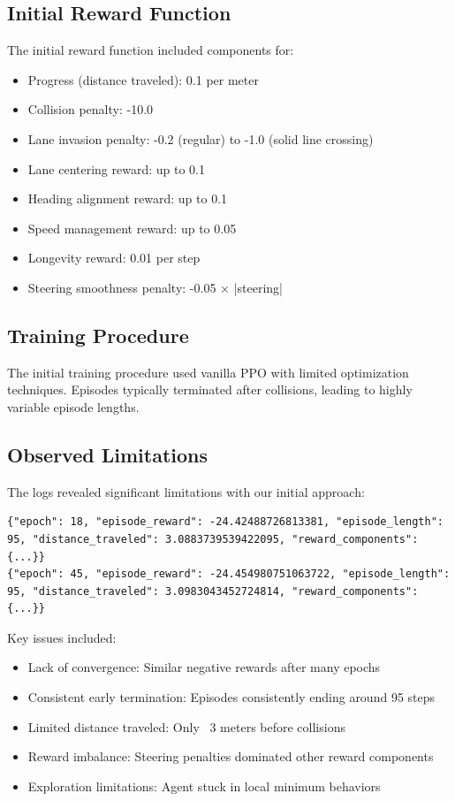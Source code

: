 \documentclass[11pt,a4paper]{article}
\begin{document}
\subsection{Initial Reward Function}
The initial reward function included components for:

\begin{itemize}
    \item Progress (distance traveled): 0.1 per meter
    \item Collision penalty: -10.0
    \item Lane invasion penalty: -0.2 (regular) to -1.0 (solid line crossing)
    \item Lane centering reward: up to 0.1
    \item Heading alignment reward: up to 0.1
    \item Speed management reward: up to 0.05
    \item Longevity reward: 0.01 per step
    \item Steering smoothness penalty: -0.05 × |steering|
\end{itemize}

\subsection{Training Procedure}
The initial training procedure used vanilla PPO with limited optimization techniques. Episodes typically terminated after collisions, leading to highly variable episode lengths.

\subsection{Observed Limitations}
The logs revealed significant limitations with our initial approach:

\begin{lstlisting}
{"epoch": 18, "episode_reward": -24.42488726813381, "episode_length": 95, "distance_traveled": 3.0883739539422095, "reward_components": {...}}
{"epoch": 45, "episode_reward": -24.454980751063722, "episode_length": 95, "distance_traveled": 3.0983043452724814, "reward_components": {...}}
\end{lstlisting}

Key issues included:
\begin{itemize}
    \item Lack of convergence: Similar negative rewards after many epochs
    \item Consistent early termination: Episodes consistently ending around 95 steps
    \item Limited distance traveled: Only ~3 meters before collisions
    \item Reward imbalance: Steering penalties dominated other reward components
    \item Exploration limitations: Agent stuck in local minimum behaviors
\end{itemize}
\end{document}
